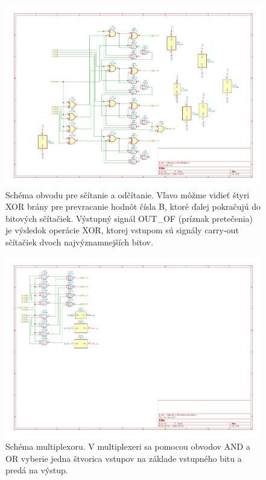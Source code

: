 \documentclass{article}
\begin{document}
    \begin{figure}[h!]
        \centering
        \includegraphics[width=.8\linewidth]{adder_sheet.pdf}
        \caption{Schéma obvodu pre sčítanie a odčítanie. Vľavo môžme vidieť štyri XOR brány pre prevracanie hodnôt čísla B, ktoré ďalej pokračujú do bitových sčítačiek. Výstupný signál OUT\_OF (príznak pretečenia) je výsledok operácie XOR, ktorej vstupom sú signály carry-out sčítačiek dvoch najvýznamnejších bitov.}
    \end{figure}

    \begin{figure}[h!]
        \centering
        \includegraphics[width=.8\linewidth]{mux_sheet.pdf}
        \caption{Schéma multiplexoru. V multiplexeri sa pomocou obvodov AND a OR vyberie jedna štvorica vstupov na základe vstupného bitu a predá na výstup.}
    \end{figure}
    
\end{document}
